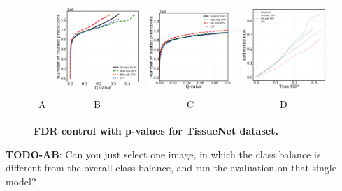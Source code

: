 \documentclass{article}
\newcommand{\todo}[2]{{\color{red} {\bf TODO-#1}: #2}}
\begin{document}
\begin{figure}
	\centering
	\begin{tabular}{cccc}
 		&
		\includegraphics[width=1.7in]{img/cnn_cells_segment_TA_fdr_control.png} & 
            \includegraphics[width=1.7in]{img/cnn_cells_segment_TA_fdr_control_loc.png}
            & 
            \includegraphics[width=1.7in]{img/cnn_FDPscat_cells_segment_TA.png}
		\\	
		A & B & C & D
	\end{tabular}
	\caption{\bf FDR control with p-values for TissueNet dataset.}
	\label{fig:tissue}
\end{figure}


\todo{AB}{Can you just select one image, in which the class balance is different from the overall class balance, and run the evaluation on that single model?}
\end{document}
